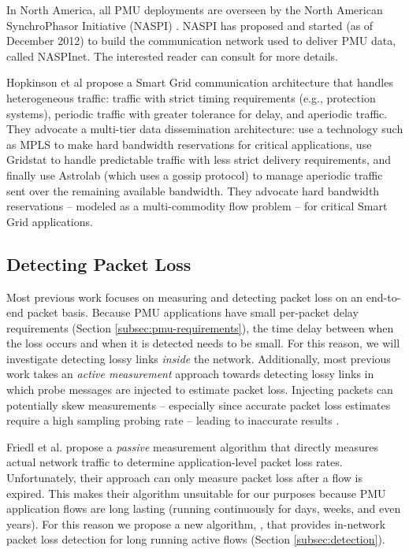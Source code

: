 In North America, all PMU deployments are overseen by the North American SynchroPhasor Initiative (NASPI) \cite{Naspi10}.  NASPI has proposed and started (as of December 2012) to build the
communication network used to deliver PMU data, called NASPInet. The interested reader can consult \cite{Naspi10} for more details.


Hopkinson et al \cite{Hopkinson09} propose a Smart Grid communication architecture that handles heterogeneous traffic: traffic with strict timing requirements (e.g., protection systems), 
periodic traffic with greater tolerance for delay, and aperiodic traffic. They advocate a multi-tier data dissemination architecture: use a technology such as MPLS to make hard
bandwidth reservations for critical applications, use Gridstat to handle predictable traffic with less strict delivery requirements, and finally use Astrolab (which uses a gossip protocol) 
to manage aperiodic traffic sent over the remaining available bandwidth. They advocate hard bandwidth reservations -- modeled as a multi-commodity flow problem -- for critical Smart
Grid applications.




\subsection{Detecting Packet Loss} 

Most previous work \cite{Almes99,Caceres99,Friedl09} focuses on measuring and detecting packet loss on an end-to-end packet basis.
Because PMU applications have small per-packet delay requirements (Section \ref{subsec:pmu-requirements}), the time delay between when the loss occurs and when it is detected needs to be small.  
For this reason, we will investigate detecting lossy links \emph{inside} the network. 
Additionally, most previous work takes an \emph{active measurement} approach towards detecting lossy links in which probe messages are injected to estimate packet loss.  Injecting packets can
potentially skew measurements -- especially since accurate packet loss estimates require a high sampling probing rate -- leading to inaccurate results \cite{Barford04}. 


Friedl et al. \cite{Friedl09} propose a \emph{passive} measurement algorithm that directly measures actual network traffic to determine application-level packet loss rates. 
Unfortunately, their approach can only measure packet loss after a flow is expired.  This makes their algorithm unsuitable for our purposes because
PMU application flows are long lasting (running continuously for days, weeks, and even years). 
For this reason we propose a new algorithm, \fls, that provides in-network packet loss detection for long running active flows (Section \ref{subsec:detection}).

